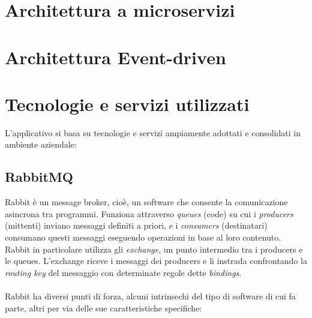 \section{Architettura a microservizi}
\section{Architettura Event-driven}

\section{Tecnologie e servizi utilizzati}

L'applicativo si basa su tecnologie e servizi ampiamente adottati e consolidati in ambiente aziendale:

\subsection{RabbitMQ}
Rabbit \`e un message broker, cio\`e, un software che consente la comunicazione asincrona tra programmi.
Funziona attraverso \textit{queues} (code) su cui i \textit{producers} (mittenti) inviano messaggi definiti a priori,
e i \textit{consumers} (destinatari) consumano questi messaggi eseguendo operazioni in base al loro contenuto.
Rabbit in particolare utilizza gli \textit{exchange}, un punto intermedio tra i producers e le queues.
L'exchange riceve i messaggi dei producers e li instrada confrontando la \textit{routing key} del messaggio con determinate regole dette \textit{bindings}.
\\\\
Rabbit ha diversi punti di forza, alcuni intrinsechi del tipo di software di cui fa parte, altri per via delle sue caratteristiche specifiche:\
